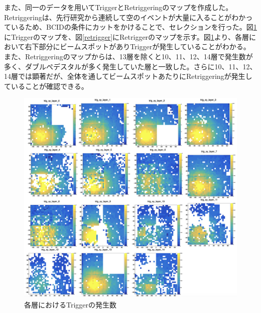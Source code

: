 また、同一のデータを用いてTriggerとRetriggeringのマップを作成した。Retriggeringは、先行研究から連続して空のイベントが大量に入ることがわかっているため、BCIDの条件にカットをかけることで、セレクションを行った。図\ref{trigger}にTriggerのマップを、図\ref{retrigger}にRetriggerのマップを示す。図\ref{trigger}より、各層において右下部分にビームスポットがありTriggerが発生していることがわかる。また、Retriggeringのマップからは、13層を除くと10、11、12、14層で発生数が多く、ダブルぺデスタルが多く発生していた層と一致した。さらに10、11、12、14層では顕著だが、全体を通してビームスポットあたりにRetriggeringが発生していることが確認できる。
\begin{figure}[H]
\begin{center}
 \includegraphics[keepaspectratio, scale=0.45]
 	{Figure/Beamtest/trigger.png}
 		\caption[Triggerのマップ]{各層におけるTriggerの発生数}
		\label{trigger}
\end{center}
\end{figure}
